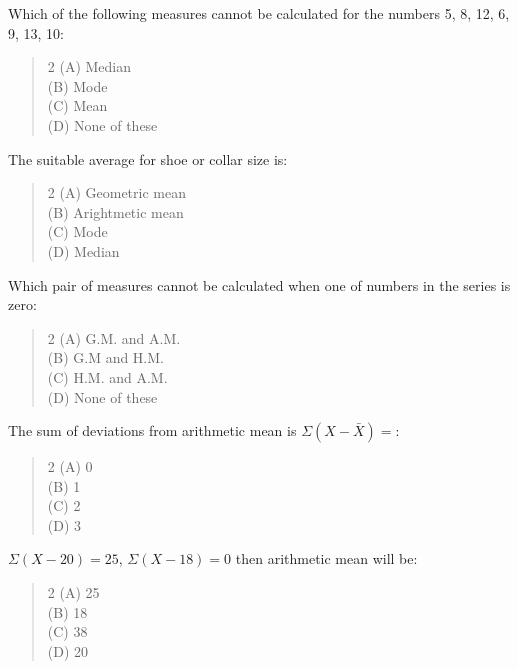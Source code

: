 \documentclass[11pt,a4paper]{article}
\begin{document}
\begin{mcqlist}
\item Which of the following measures cannot be calculated for the numbers 5, 8, 12, 6, 9, 13, 10:
\begin{quote}\begin{multicols}{2}
\noindent (A) Median \\
(B) Mode \\
(C) Mean \\
(D) None of these
\end{multicols}\end{quote}

\item The suitable average for shoe or collar size is:
\begin{quote}\begin{multicols}{2}
\noindent (A) Geometric mean \\
(B) Arightmetic mean \\
(C) Mode \\
(D) Median
\end{multicols}\end{quote}

\item Which pair of measures cannot be calculated when one of numbers in the series is zero:
\begin{quote}\begin{multicols}{2}
\noindent (A) G.M. and A.M. \\
(B) G.M and H.M. \\
(C) H.M. and A.M. \\
(D) None of these
\end{multicols}\end{quote}

\item The sum of deviations from arithmetic mean is $\Sigma (X - \bar{X}) = $:
\begin{quote}\begin{multicols}{2}
\noindent (A) 0 \\
(B) 1 \\
(C) 2 \\
(D) 3
\end{multicols}\end{quote}

\item $\Sigma (X - 20) = 25$, $\Sigma (X - 18) = 0$ then arithmetic mean will be:
\begin{quote}\begin{multicols}{2}
\noindent (A) 25 \\
(B) 18 \\
(C) 38 \\
(D) 20
\end{multicols}\end{quote}


\end{mcqlist}
\end{document}
